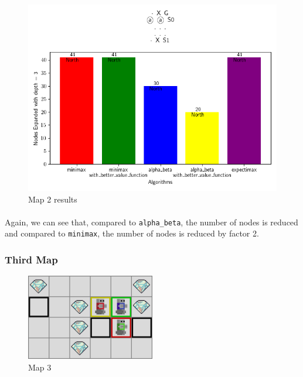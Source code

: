 \documentclass{article}
\begin{document}
    
\begin{figure}[h]
    \centering
    \includegraphics[width=\textwidth]{media/map2023_10_29_13_56_42.png}
    \caption{Map 2 results}
    \label{fig:image2}
\end{figure}
\vspace{1em}

\paragraph{}
Again, we can see that, compared to \texttt{alpha\_beta},
the number of nodes is reduced and compared to \texttt{minimax},
the number of nodes is reduced by factor 2.


\newpage
\subsubsection{Third Map}

\begin{figure}
    \centering
    \includegraphics[width=0.5\textwidth]{media/map/map2023_10_29_13_53_25.png}
    \caption{Map 3}
    \label{fig:image3}
\end{figure}
    
\end{document}
